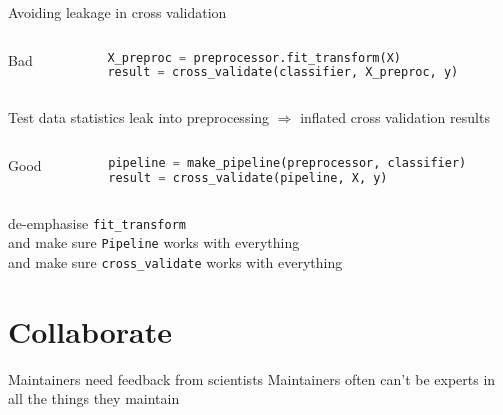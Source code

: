 \documentclass[aspectratio=169, 22pt]{beamer}
\begin{document}
\begin{plain}{Avoiding leakage in cross validation}
	\begin{columns}\begin{column}{0.1\textwidth}Bad\end{column}\begin{column}{.9\textwidth}
	\begin{lstlisting}[language=python]
X_preproc = preprocessor.fit_transform(X)
result = cross_validate(classifier, X_preproc, y)
	\end{lstlisting}
	\end{column}\end{columns}
	Test data statistics leak into preprocessing $\Rightarrow$ inflated cross validation results
	\begin{columns}\begin{column}{0.1\textwidth}Good\end{column}\begin{column}{.9\textwidth}
	\begin{lstlisting}[language=python]
pipeline = make_pipeline(preprocessor, classifier)
result = cross_validate(pipeline, X, y)
	\end{lstlisting}
	\end{column}\end{columns}

	\begin{itemize}
			\p[Solution] de-emphasise \verb|fit_transform|\\
			and make sure \verb|Pipeline| works with everything\\
			and make sure \verb|cross_validate| works with everything
	\end{itemize}
\end{plain}


\section{Collaborate}

\begin{points}{Maintainers need feedback from scientists}
	\p Maintainers often can't be experts in all the things they maintain
\end{points}


\end{document}
